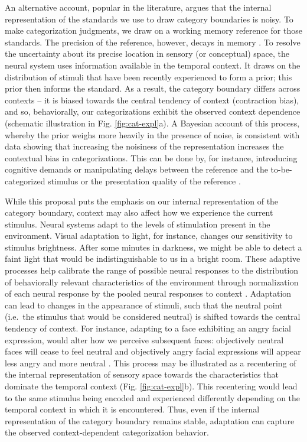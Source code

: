 \documentclass[a4paper, nobind]{templates/ociamthesis}
\begin{document}
An alternative account, popular in the literature, argues that the internal representation of the standards we use to draw category boundaries is noisy. To make categorization judgments, we draw on a working memory reference for those standards. The precision of the reference, however, decays in memory \autocite{jou2004,ashourian2011,olkkonen2014a}. To resolve the uncertainty about its precise location in sensory (or conceptual) space, the neural system uses information available in the temporal context. It draws on the distribution of stimuli that have been recently experienced to form a prior; this prior then informs the standard. As a result, the category boundary differs across contexts -- it is biased towards the central tendency of context (contraction bias), and so, behaviorally, our categorizations exhibit the observed context dependence (schematic illustration in Fig. \ref{fig:cat-expl}a). A Bayesian account of this process, whereby the prior weighs more heavily in the presence of noise, is consistent with data showing that increasing the noisiness of the representation increases the contextual bias in categorizations. This can be done by, for instance, introducing cognitive demands \autocite{ashourian2011,allred2016} or manipulating delays between the reference and the to-be-categorized stimulus or the presentation quality of the reference \autocite{olkkonen2014}.

While this proposal puts the emphasis on our internal representation of the category boundary, context may also affect how we experience the current stimulus. Neural systems adapt to the levels of stimulation present in the environment. Visual adaptation to light, for instance, changes our sensitivity to stimulus brightness. After some minutes in darkness, we might be able to detect a faint light that would be indistinguishable to us in a bright room. These adaptive processes help calibrate the range of possible neural responses to the distribution of behaviorally relevant characteristics of the environment \autocite{webster2015} through normalization of each neural response by the pooled neural responses to context \autocite{carandini2012}. Adaptation can lead to changes in the appearance of stimuli, such that the neutral point (i.e.~the stimulus that would be considered neutral) is shifted towards the central tendency of context. For instance, adapting to a face exhibiting an angry facial expression, would alter how we perceive subsequent faces: objectively neutral faces will cease to feel neutral and objectively angry facial expressions will appear less angry and more neutral \autocite{webster2011}. This process may be illustrated as a recentering of the internal representation of sensory space towards the characteristics that dominate the temporal context (Fig. \ref{fig:cat-expl}b). This recentering would lead to the same stimulus being encoded and experienced differently depending on the temporal context in which it is encountered. Thus, even if the internal representation of the category boundary remains stable, adaptation can capture the observed context-dependent categorization behavior.
\end{document}

